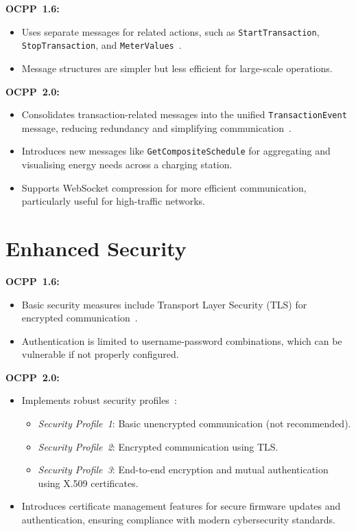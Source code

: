 \documentclass[12pt,a4paper]{report}
\begin{document}
\textbf{OCPP~1.6:}
\begin{sloppypar}
\begin{itemize}
  \item Uses separate messages for related actions, such as \texttt{StartTransaction},
        \texttt{StopTransaction}, and \texttt{MeterValues}~\autocite{ocpp16_ed2}.
  \item Message structures are simpler but less efficient for large-scale operations.
\end{itemize}
\end{sloppypar}
\noindent
\textbf{OCPP~2.0:}
\begin{sloppypar}
\begin{itemize}
  \item Consolidates transaction-related messages into the unified \texttt{TransactionEvent}
        message, reducing redundancy and simplifying communication~\autocite{ocpp201}.
  \item Introduces new messages like \texttt{GetCompositeSchedule} for aggregating and
        visualising energy needs across a charging station.
  \item Supports WebSocket compression for more efficient communication, particularly useful
        for high-traffic networks.
\end{itemize}
\end{sloppypar}

\section{Enhanced Security}

\textbf{OCPP~1.6:}
\begin{itemize}
  \item Basic security measures include Transport Layer Security (TLS) for encrypted
        communication~\autocite{ocpp16_ed2}.
  \item Authentication is limited to username-password combinations, which can be vulnerable
        if not properly configured.
\end{itemize}
\noindent
\textbf{OCPP~2.0:}
\begin{itemize}
  \item Implements robust security profiles~\autocite{ocpp201}:
        \begin{itemize}
          \item \textit{Security Profile~1}: Basic unencrypted communication (not recommended).
          \item \textit{Security Profile~2}: Encrypted communication using TLS.
          \item \textit{Security Profile~3}: End-to-end encryption and mutual authentication
                using X.509 certificates.
        \end{itemize}
  \item Introduces certificate management features for secure firmware updates and
        authentication, ensuring compliance with modern cybersecurity standards.
\end{itemize}
\end{document}
